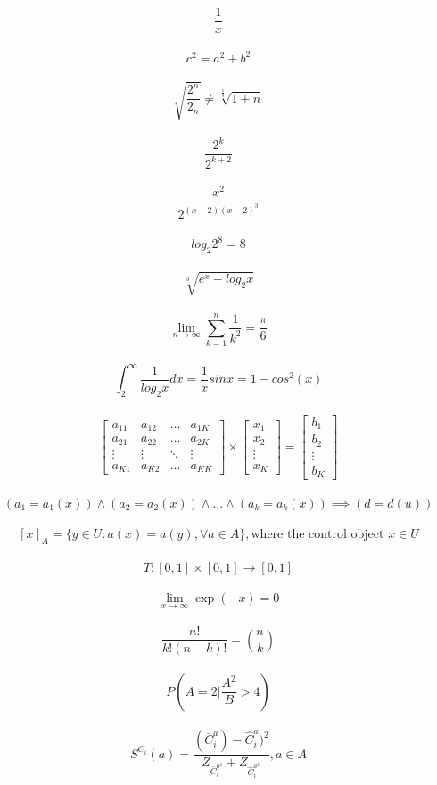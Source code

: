 \documentclass[12pt, letterpaper]{article}
\begin{document}
$$ \frac{1} {x} $$\\
$$ c^2=a^{2}+b^{2} $$\\
$$ \sqrt{ \frac{2^n} {2_n}} \neq \sqrt[\frac{1}{3}]{1+n} $$\\
$$ \frac{2^k} {2^{k+2}} $$\\
$$ \frac{x^2} {2^{(x+2)(x-2)^3}} $$\
$$ log_{2}2^8 = 8 $$\\
$$ \sqrt[3]{e^x - log_{2}x} $$\\
$$ \lim_{n\to\infty} \sum_{k=1}^{n} \frac{1}{k^2} = \frac {\pi} {6} $$\\
$$ \int_{2}^{\infty} \frac{1}{log_{2}x} dx = \frac{1}{x}sin x = 1 - cos^2(x) $$\\
$$ \left[\begin{array}{cccc}
a_{11} & a_{12} & \ldots & a_{1K} \\
a_{21} & a_{22} & \ldots & a_{2K} \\
\vdots & \vdots & \ddots & \vdots \\
a_{K1} & a_{K2} & \ldots & a_{KK}
\end{array} \right] \times 
\left[\begin{array}{c}
x_1 \\
x_2 \\
\vdots \\
x_K
\end{array} \right] =
\left[\begin{array}{c}
b_1 \\
b_2 \\
\vdots \\
b_K
\end{array} \right] $$\\
$$ (a_1 = a_1(x)) \wedge (a_2 = a_2(x)) \wedge \ldots \wedge (a_k = a_k(x)) \implies (d = d(u))  $$\\
$$ [x]_A = \{y \in U : a(x) = a(y), \forall a \in A \}, \text{where the control object } x \in U $$\\
$$ T : [0,1] \times [0,1] \rightarrow [0,1] $$\\
$$ \lim_{x\to\infty} \exp(-x) = 0 $$\\
$$ \frac{n!}{k!(n-k)!} = \binom{n}{k} $$\\
$$ P\left(A = 2 \bigg| \frac{A^2}{B} > 4 \right) $$\\
$$ S^{C_i}(a) = \frac{(\bar{C}_i^a) - \hat{C}_i^a)^2}{Z_{\bar{C}_i^{a^2}} + Z_{\hat{C}^{a^2}_i }}, a \in A $$\\
\end{document}
